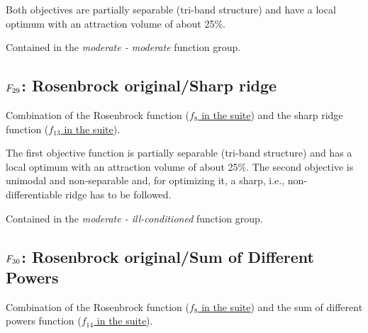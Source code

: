 Both objectives are partially separable (tri-band structure) and have
a local optimum with an attraction volume of about 25\%.

Contained in the \emph{moderate - moderate} function group.



\subsection[\texorpdfstring{\protect\(F_{29}\protect\): Rosenbrock original/Sharp ridge}{F29: Rosenbrock original/Sharp ridge}]{\texorpdfstring{\protect\(F_{29}\protect\): Rosenbrock original/Sharp ridge}{}}
\label{index:rosenbrock-original-sharp-ridge}\label{index:f29}
Combination of the Rosenbrock function (\href{https://coco.gforge.inria.fr/downloads/download16.00/bbobdocfunctions.pdf\#page=40}{\(f_8\) in the \bbob suite}) and the
sharp ridge function (\href{https://coco.gforge.inria.fr/downloads/download16.00/bbobdocfunctions.pdf\#page=65}{\(f_{13}\) in the \bbob suite}).

The first objective function is partially separable (tri-band structure)
and has a local optimum with an attraction volume of about 25\%.
The second objective is unimodal and non-separable and, for
optimizing it, a sharp, i.e., non-differentiable ridge has to be followed.

Contained in the \emph{moderate - ill-conditioned} function group.



\subsection[\texorpdfstring{\protect\(F_{30}\protect\): Rosenbrock original/Sum of Different Powers}{F30: Rosenbrock original/Sum of Different Powers}]{\texorpdfstring{\protect\(F_{30}\protect\): Rosenbrock original/Sum of Different Powers}{}}
\label{index:f30}\label{index:rosenbrock-original-sum-of-different-powers}
Combination of the Rosenbrock function (\href{https://coco.gforge.inria.fr/downloads/download16.00/bbobdocfunctions.pdf\#page=40}{\(f_8\) in the \bbob suite}) and the sum of different powers function
(\href{https://coco.gforge.inria.fr/downloads/download16.00/bbobdocfunctions.pdf\#page=70}{\(f_{14}\) in the \bbob suite}).

